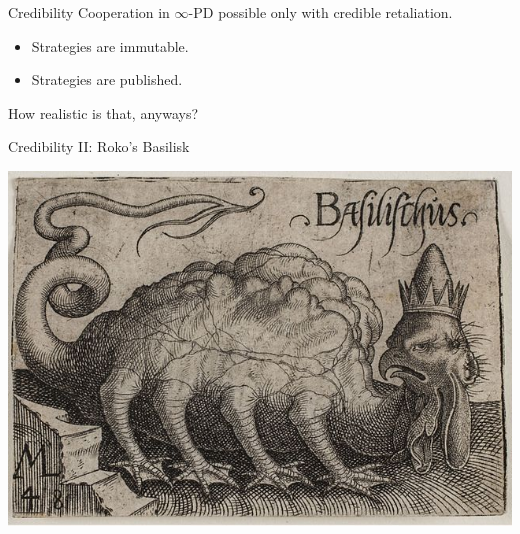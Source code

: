 \documentclass[pdf]{beamer}
\begin{document}
\begin{frame}{Credibility}
  Cooperation in $\infty$-PD possible only with credible retaliation.

  \pause
  \begin{itemize}
  \item Strategies are immutable.
  \item Strategies are published.
  \end{itemize}

  \pause
  How realistic is that, anyways?
\end{frame}

\begin{frame}{Credibility II: Roko's Basilisk}
  \begin{center}
    \includegraphics[scale=0.25]{basilisk.jpg}
  \end{center}
\end{frame}
\end{document}
